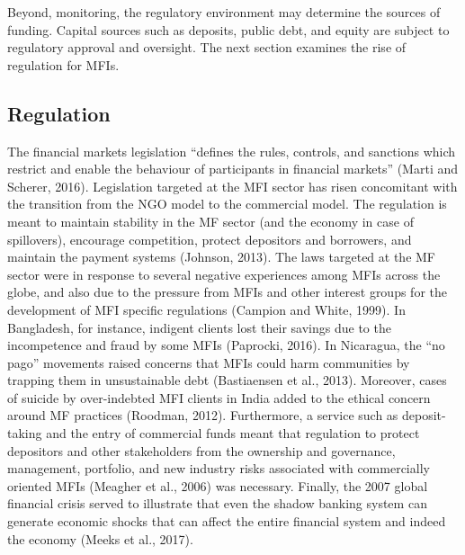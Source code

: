 \documentclass[a4paper, nobind]{templates/ociamthesis}
\begin{document}
Beyond, monitoring, the regulatory environment may determine the sources of funding. Capital sources such as deposits, public debt, and equity are subject to regulatory approval and oversight. The next section examines the rise of regulation for MFIs.

\hypertarget{regulation}{%
\subsection{Regulation}\label{regulation}}

\noindent The financial markets legislation ``defines the rules, controls, and sanctions which restrict and enable the behaviour of participants in financial markets'' (Marti and Scherer, 2016). Legislation targeted at the MFI sector has risen concomitant with the transition from the NGO model to the commercial model. The regulation is meant to maintain stability in the MF sector (and the economy in case of spillovers), encourage competition, protect depositors and borrowers, and maintain the payment systems (Johnson, 2013). The laws targeted at the MF sector were in response to several negative experiences among MFIs across the globe, and also due to the pressure from MFIs and other interest groups for the development of MFI specific regulations (Campion and White, 1999).
In Bangladesh, for instance, indigent clients lost their savings due to the incompetence and fraud by some MFIs (Paprocki, 2016). In Nicaragua, the ``no pago'' movements raised concerns that MFIs could harm communities by trapping them in unsustainable debt (Bastiaensen et al., 2013). Moreover, cases of suicide by over-indebted MFI clients in India added to the ethical concern around MF practices (Roodman, 2012). Furthermore, a service such as deposit-taking and the entry of commercial funds meant that regulation to protect depositors and other stakeholders from the ownership and governance, management, portfolio, and new industry risks associated with commercially oriented MFIs (Meagher et al., 2006) was necessary. Finally, the 2007 global financial crisis served to illustrate that even the shadow banking system can generate economic shocks that can affect the entire financial system and indeed the economy (Meeks et al., 2017).
\end{document}
